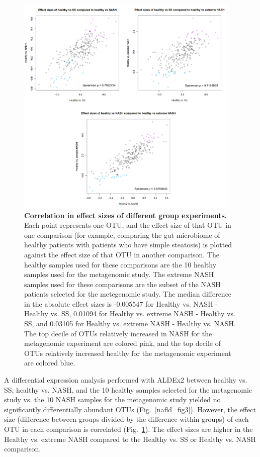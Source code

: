 \begin{figure}[h]
\begin{center}
\includegraphics[width=0.95\textwidth]{nafld_16s_effect_sizes.png}
\caption{\textbf{Correlation in effect sizes of different group experiments.} Each point represents one OTU, and the effect size of that OTU in one comparison (for example, comparing the gut microbiome of healthy patients with patients who have simple steatosis) is plotted against the effect size of that OTU in another comparison. The healthy samples used for these comparisons are the 10 healthy samples used for the metagenomic study. The extreme NASH samples used for these comparisons are the subset of the NASH patients selected for the metegenomic study. The median difference in the absolute effect sizes is -0.005547 for Healthy vs. NASH - Healthy vs. SS, 0.01094 for Healthy vs. extreme NASH - Healthy vs. SS, and 0.03105 for Healthy vs. extreme NASH - Healthy vs. NASH. The top decile of OTUs relatively increased in NASH for the metagenomic experiment are colored pink, and the top decile of OTUs relatively increased healthy for the metagenomic experiment are colored blue.}
\end{center}
\label{nafld_fig4}
\end{figure}

A differential expression analysis performed with ALDEx2 between healthy vs. SS, healthy vs. NASH, and the 10 healthy samples selected for the metagenomic study vs. the 10 NASH samples for the metagenomic study yielded no significantly differentially abundant OTUs (Fig.~\ref{nafld_fig3}). However, the effect size (difference between groups divided by the difference within groups) of each OTU in each comparison is correlated (Fig.~\ref{nafld_fig4}). The effect sizes are higher in the Healthy vs. extreme NASH compared to the Healthy vs. SS or Healthy vs. NASH comparison.

